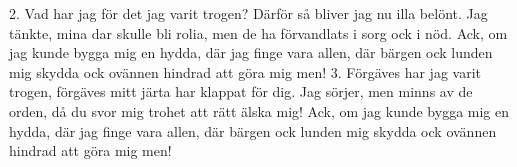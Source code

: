 2.  Vad har jag för det jag varit trogen?
    Därför så bliver jag nu illa belönt.
    Jag tänkte, mina dar skulle bli rolia,
    men de ha förvandlats i sorg ock i nöd.
    Ack, om jag kunde bygga mig en hydda,
    där jag finge vara allen,
    där bärgen ock lunden mig skydda
    ock ovännen hindrad att göra mig men!
3.  Förgäves har jag varit trogen,
    förgäves mitt järta har klappat för dig.
    Jag sörjer, men minns av de orden,
    då du svor mig trohet att rätt älska mig!
    Ack, om jag kunde bygga mig en hydda,
    där jag finge vara allen,
    där bärgen ock lunden mig skydda
    ock ovännen hindrad att göra mig men!
